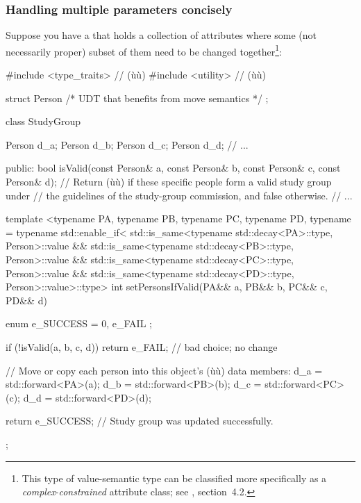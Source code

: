 \subsubsection[Handling multiple parameters concisely]{Handling multiple parameters concisely}\label{handling-multiple-parameters-concisely}

Suppose you have a  that holds a
collection of attributes where some (not necessarily proper) subset of
them need to be changed together{\cprotect\footnote{This type of
value-semantic type can be classified more specifically as a
\emph{complex}-\emph{constrained} attribute class; see \cite{lakos2a}, section~4.2.}}:

\begin{emcppslisting}
#include <type_traits>  // (ù{}ù)
#include <utility>      // (ù{}ù)

struct Person { /* UDT that benefits from move semantics */ };

class StudyGroup
{
    Person d_a;
    Person d_b;
    Person d_c;
    Person d_d;
    // ...

public:
    bool isValid(const Person& a, const Person& b, const Person& c, const Person& d);
        // Return (ù{}ù) if these specific people form a valid study group under
        // the guidelines of the study-group commission, and false otherwise.
    // ...

    template <typename PA, typename PB, typename PC, typename PD,
        typename = typename std::enable_if<
            std::is_same<typename std::decay<PA>::type, Person>::value &&
            std::is_same<typename std::decay<PB>::type, Person>::value &&
            std::is_same<typename std::decay<PC>::type, Person>::value &&
            std::is_same<typename std::decay<PD>::type, Person>::value>::type>
    int setPersonsIfValid(PA&& a, PB&& b, PC&& c, PD&& d)
    {
        enum { e_SUCCESS = 0, e_FAIL };

        if (!isValid(a, b, c, d))
        {
            return e_FAIL;  // bad choice; no change
        }

        // Move or copy each person into this object's (ù{}ù) data members:
        d_a = std::forward<PA>(a);
        d_b = std::forward<PB>(b);
        d_c = std::forward<PC>(c);
        d_d = std::forward<PD>(d);

        return e_SUCCESS;  // Study group was updated successfully.
    }
};
\end{emcppslisting}

